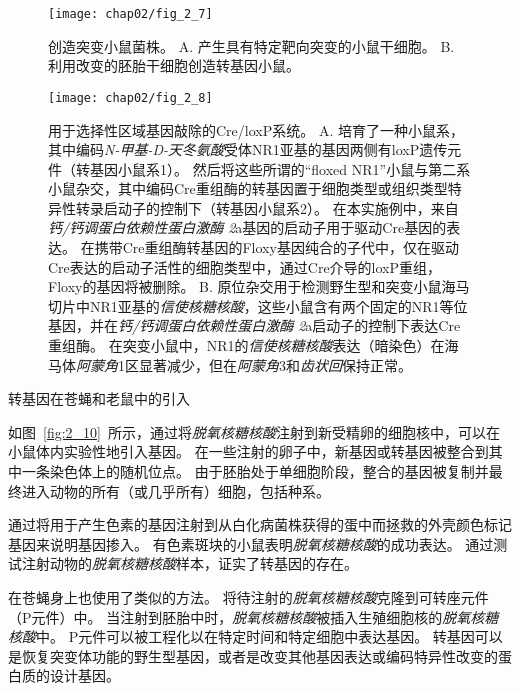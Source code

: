 \begin{figure}[htbp]
	\centering
	\texttt{[image: chap02/fig\_2\_7]}
	\caption{创造突变小鼠菌株\cite{alberts2017molecular}。
		A. 产生具有特定靶向突变的小鼠干细胞。
		B. 利用改变的胚胎干细胞创造转基因小鼠。}
	\label{fig:2_7}
\end{figure}


\begin{figure}[htbp]
	\centering
	\texttt{[image: chap02/fig\_2\_8]}
	\caption{用于选择性区域基因敲除的Cre/loxP系统。
		A. 培育了一种小鼠系，其中编码\textit{N-甲基-D-天冬氨酸}受体NR1亚基的基因两侧有loxP遗传元件（转基因小鼠系1）。
		然后将这些所谓的“floxed NR1”小鼠与第二系小鼠杂交，其中编码Cre重组酶的转基因置于细胞类型或组织类型特异性转录启动子的控制下（转基因小鼠系2）。
		在本实施例中，来自\textit{钙/钙调蛋白依赖性蛋白激酶 2}a基因的启动子用于驱动Cre基因的表达。
		在携带Cre重组酶转基因的Floxy基因纯合的子代中，仅在驱动Cre表达的启动子活性的细胞类型中，通过Cre介导的loxP重组，Floxy的基因将被删除。
		B. 原位杂交用于检测野生型和突变小鼠海马切片中NR1亚基的\textit{信使核糖核酸}，这些小鼠含有两个固定的NR1等位基因，并在\textit{钙/钙调蛋白依赖性蛋白激酶 2}a启动子的控制下表达Cre重组酶。
		在突变小鼠中，NR1的\textit{信使核糖核酸}表达（暗染色）在海马体\textit{阿蒙角}1区显著减少，但在\textit{阿蒙角}3和\textit{齿状回}保持正常\cite{tsien1996essential}。}
	\label{fig:2_8}
\end{figure}



\begin{proposition}[神经解剖学导航术语] \label{box:2_3}
	
	\quad \quad 转基因在苍蝇和老鼠中的引入
	
	\quad \quad 如图~\ref{fig:2_10}~所示，通过将\textit{脱氧核糖核酸}注射到新受精卵的细胞核中，可以在小鼠体内实验性地引入基因。
	在一些注射的卵子中，新基因或转基因被整合到其中一条染色体上的随机位点。
	由于胚胎处于单细胞阶段，整合的基因被复制并最终进入动物的所有（或几乎所有）细胞，包括种系。
	
	\quad \quad 通过将用于产生色素的基因注射到从白化病菌株获得的蛋中而拯救的外壳颜色标记基因来说明基因掺入。
	有色素斑块的小鼠表明\textit{脱氧核糖核酸}的成功表达。
	通过测试注射动物的\textit{脱氧核糖核酸}样本，证实了转基因的存在。
	
	\quad \quad 在苍蝇身上也使用了类似的方法。
	将待注射的\textit{脱氧核糖核酸}克隆到可转座元件（P元件）中。
	当注射到胚胎中时，\textit{脱氧核糖核酸}被插入生殖细胞核的\textit{脱氧核糖核酸}中。
	P元件可以被工程化以在特定时间和特定细胞中表达基因。
	转基因可以是恢复突变体功能的野生型基因，或者是改变其他基因表达或编码特异性改变的蛋白质的设计基因。
	
\end{proposition}


